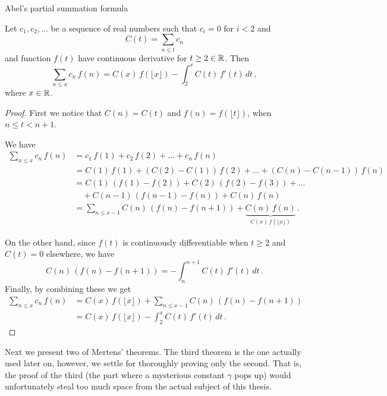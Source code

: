 \documentclass{article}
\begin{document}
\begin{lemma}
\label{lemma:abelsum}
Abel's partial summation formula

Let $c_1, c_2,\dots$ be a sequence of real numbers such that $c_i=0$ for $i<2$ and
\begin{equation*}
    C(t) = \sum_{n\leq t} c_n
\end{equation*}
and function $f(t)$ have continuous derivative for $t \geq 2 \in \mathbb{R}$. Then
\begin{equation*}
    \sum_{n\leq x} c_n\,f(n) = C(x)\,f(\lfloor x\rfloor)-\int_2^x C(t)\,f'(t)\,dt\,,
\end{equation*}
where $x\in\mathbb{R}$.

\clearpage

\begin{proof}
First we notice that $C(n) = C(t)$ and $f(n)=f(\lfloor t\rfloor)$, when $n\leq t < n+1$.

We have
\begin{align*}
    \sum_{n\leq x} c_n\,f(n) & = c_1\,f(1) + c_2\,f(2) + \dots + c_n\,f(n)\\
    & =  C(1)\,f(1) + (C(2)-C(1))\,f(2) + \dots + (C(n)-C(n-1))\,f(n)\\
    & = C(1)\,(f(1)-f(2)) + C(2)\,(f(2)-f(3)) + \dots\\
    & \quad + C(n-1)\,(f(n-1)-f(n)) + C(n)\,f(n)\\
    & = \sum_{n\leq x-1} C(n)\,(f(n)-f(n+1)) + \underbrace{C(n)\,f(n)}_\text{$C(x)\,f(\lfloor x\rfloor)$}\,.
\end{align*}

On the other hand, since $f(t)$ is continuously differentiable when $t\geq2$ and $C(t)=0$ elsewhere, we have
\begin{equation*}
     C(n)\,(f(n)-f(n+1)) = -\int_n^{n+1} C(t)\,f'(t)\,dt\,.
\end{equation*}
Finally, by combining these we get
\begin{align*}
    \sum_{n\leq x} c_n\,f(n) & = C(x)\,f(\lfloor x\rfloor) + \sum_{n\leq x-1} C(n)\,(f(n)-f(n+1))\\
    & = C(x)\,f(\lfloor x\rfloor)-\int_2^x C(t)\,f'(t)\,dt\,.
\end{align*}

\end{proof}
\end{lemma}

Next we present two of Mertens' theorems. The third theorem is the one actually used later on, however, we settle for thoroughly proving only the second. That is, the proof of the third (the part where a mysterious constant $\gamma$ pops up) would unfortunately steal too much space from the actual subject of this thesis.
\end{document}

